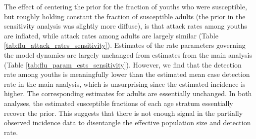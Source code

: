 The effect of centering the prior for the fraction of youths who were susceptible, but roughly holding constant the fraction of susceptible adults (the prior in the sensitivity analysis was slightly more diffuse), is that attack rates among youths are inflated, while attack rates among adults are largely similar (Table \ref{tab:flu_attack_rates_sensitivity}). Estimates of the rate parameters governing the model dynamics are largely unchanged from estimates from the main analysis (Table \ref{tab:flu_param_ests_sensitivity}). However, we find that the detection rate among youths is meaningfully lower than the estimated mean case detection rate in the main analysis, which is unsurprising since the estimated incidence is higher. The corresponding estimates for adults are essentially unchanged. In both analyses, the estimated susceptible fractions of each age stratum essentially recover the prior. This suggests that there is not enough signal in the partially observed incidence data to disentangle the effective population size and detection rate. 


